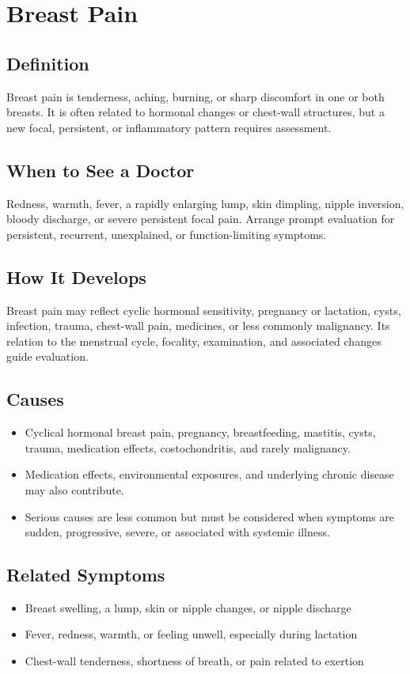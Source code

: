 \chapter{Breast Pain}

\section*{Definition}
Breast pain is tenderness, aching, burning, or sharp discomfort in one or both breasts. It is often related to hormonal changes or chest-wall structures, but a new focal, persistent, or inflammatory pattern requires assessment.

\section*{When to See a Doctor}
Redness, warmth, fever, a rapidly enlarging lump, skin dimpling, nipple inversion, bloody discharge, or severe persistent focal pain. Arrange prompt evaluation for persistent, recurrent, unexplained, or function-limiting symptoms.

\section*{How It Develops}
Breast pain may reflect cyclic hormonal sensitivity, pregnancy or lactation, cysts, infection, trauma, chest-wall pain, medicines, or less commonly malignancy. Its relation to the menstrual cycle, focality, examination, and associated changes guide evaluation.

\section*{Causes}
\begin{itemize}
  \item Cyclical hormonal breast pain, pregnancy, breastfeeding, mastitis, cysts, trauma, medication effects, costochondritis, and rarely malignancy.
  \item Medication effects, environmental exposures, and underlying chronic disease may also contribute.
  \item Serious causes are less common but must be considered when symptoms are sudden, progressive, severe, or associated with systemic illness.
\end{itemize}

\section*{Related Symptoms}
\begin{itemize}
 \item Breast swelling, a lump, skin or nipple changes, or nipple discharge
 \item Fever, redness, warmth, or feeling unwell, especially during lactation
 \item Chest-wall tenderness, shortness of breath, or pain related to exertion
\end{itemize}

